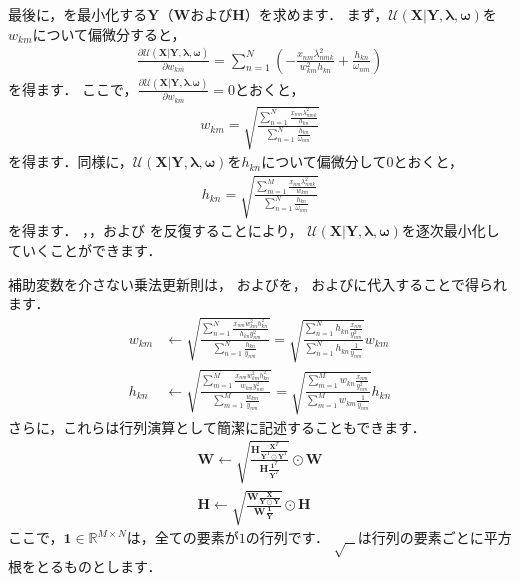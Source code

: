最後に，を最小化する$\bm{Y}$（$\bm{W}$および$\bm{H}$）を求めます．
まず，$\mathcal{U}(\bm{X}|\bm{Y},\bm\lambda,\bm\omega)$を$w_{km}$について偏微分すると，
\begin{align}
\frac{\partial \mathcal{U}(\bm{X}|\bm{Y},\bm\lambda,\bm\omega)}{\partial w_{km}} 
= \sum_{n=1}^N \left(- \frac{x_{nm}\lambda_{nmk}^2}{w_{km}^2 h_{kn}} + \frac{h_{kn}}{\omega_{nm}}\right)
\end{align}
を得ます．
ここで，$\frac{\partial \mathcal{U}(\bm{X}|\bm{Y},\bm\lambda.\bm\omega)}{\partial w_{km}}=0$とおくと，
\begin{align}
w_{km} 
= \sqrt{
       \frac{\sum_{n=1}^N \frac{x_{nm} \lambda_{nmk}^2}{h_{kn}}}
       {\sum_{n=1}^N \frac{h_{kn}}{\omega_{nm}}}
  }
\label{eqn:is_nmf_mu_w}
\end{align}
を得ます．同様に，$\mathcal{U}(\bm{X}|\bm{Y},\bm\lambda,\bm\omega)$を$h_{kn}$について偏微分して$0$とおくと，
\begin{align}
h_{kn} 
= \sqrt{
  \frac{\sum_{m=1}^M \frac{x_{nm} \lambda_{nmk}^2}{w_{km}}}
       {\sum_{n=1}^N \frac{h_{kn}}{\omega_{nm}}}
  }
\label{eqn:is_nmf_mu_h}
\end{align}
を得ます．
，，および
を反復することにより，
$\mathcal{U}(\bm{X}|\bm{Y},\bm\lambda,\bm\omega)$を逐次最小化していくことができます．

補助変数を介さない乗法更新則は，
およびを，
およびに代入することで得られます．
\begin{align}
w_{km} 
&\gets 
\sqrt{
       \frac{\sum_{n=1}^N \frac{x_{nm} w_{km}^2 h_{kn}^2}{h_{kn} y_{nm}^2}}
       {\sum_{n=1}^N \frac{h_{kn}}{y_{nm}}}
  }
=
\sqrt{
       \frac{\sum_{n=1}^N h_{kn} \frac{x_{nm}}{y_{nm}^2}}
       {\sum_{n=1}^N h_{kn} \frac{1}{y_{nm}}}
  } w_{km}
\label{eqn:is_nmf_mu_w2}
\\
h_{kn} 
&\gets 
\sqrt{
       \frac{\sum_{m=1}^M \frac{x_{nm} w_{km}^2 h_{kn}^2}{w_{km} y_{nm}^2}}
       {\sum_{m=1}^M \frac{w_{km}}{y_{nm}}}
  }
=
\sqrt{
       \frac{\sum_{m=1}^M w_{kn} \frac{x_{nm}}{y_{nm}^2}}
       {\sum_{m=1}^M w_{km} \frac{1}{y_{nm}}}
  } h_{kn}
\label{eqn:is_nmf_mu_h2}
\end{align}
さらに，これらは行列演算として簡潔に記述することもできます．
\begin{align}
\bm{W} \gets \sqrt{\frac{\bm{H} \frac{\bm{X}^T}{\bm{Y}^T \odot \bm{Y}^T}} {\bm{H}\frac{\bm{1}^T}{\bm{Y}^T}}} \odot \bm{W}
\label{eqn:is_nmf_mu_W}
\\
\bm{H} \gets \sqrt{\frac{\bm{W} \frac{\bm{X}}{\bm{Y} \odot \bm{Y}}} {\bm{W}\frac{\bm{1}}{\bm{Y}}}} \odot \bm{H}
\label{eqn:is_nmf_mu_H}
\end{align}
ここで，$\bm{1} \in \mathbb{R}^{M \times N}$は，全ての要素が$1$の行列です．
$\sqrt{\ \ \ }$は行列の要素ごとに平方根をとるものとします．

